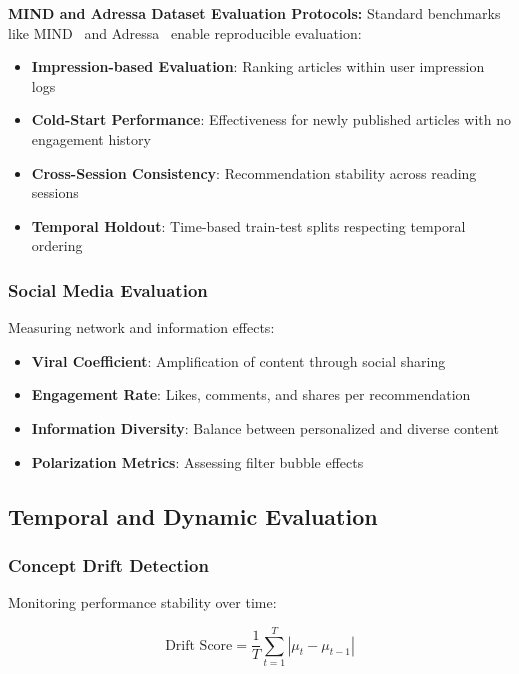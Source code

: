 \textbf{MIND and Adressa Dataset Evaluation Protocols:}
Standard benchmarks like MIND~\cite{wu2020mind_news} and Adressa~\cite{gulla2017adressa} enable reproducible evaluation:
\begin{itemize}
    \item \textbf{Impression-based Evaluation}: Ranking articles within user impression logs
    \item \textbf{Cold-Start Performance}: Effectiveness for newly published articles with no engagement history
    \item \textbf{Cross-Session Consistency}: Recommendation stability across reading sessions
    \item \textbf{Temporal Holdout}: Time-based train-test splits respecting temporal ordering
\end{itemize}

\subsubsection{Social Media Evaluation}

Measuring network and information effects:

\begin{itemize}
    \item \textbf{Viral Coefficient}: Amplification of content through social sharing
    \item \textbf{Engagement Rate}: Likes, comments, and shares per recommendation
    \item \textbf{Information Diversity}: Balance between personalized and diverse content
    \item \textbf{Polarization Metrics}: Assessing filter bubble effects
\end{itemize}

\subsection{Temporal and Dynamic Evaluation}

\subsubsection{Concept Drift Detection}

Monitoring performance stability over time:

\begin{equation}
\text{Drift Score} = \frac{1}{T} \sum_{t=1}^T |\mu_{t} - \mu_{t-1}|
\label{eq:drift_score}
\end{equation}

